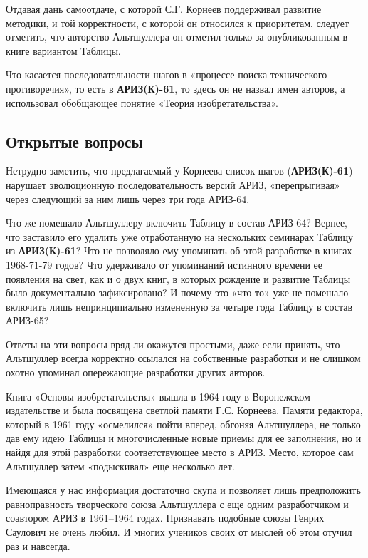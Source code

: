 \documentclass[11pt,a4paper]{article}
\begin{document}
Отдавая дань самоотдаче, с которой С.Г. Корнеев поддерживал развитие методики,
и той корректности, с которой он относился к приоритетам, следует отметить,
что авторство Альтшуллера он отметил только за опубликованным в книге
вариантом Таблицы.

Что касается последовательности шагов в «процессе поиска технического
противоречия», то есть в \textbf{АРИЗ(К)-61}, то здесь он не назвал имен
авторов, а использовал обобщающее понятие «Теория изобретательства».

\subsection*{Открытые вопросы}

Нетрудно заметить, что предлагаемый у Корнеева список шагов
(\textbf{АРИЗ(К)-61}) нарушает эволюционную последовательность версий АРИЗ,
«перепрыгивая» через следующий за ним лишь через три года АРИЗ-64.

Что же помешало Альтшуллеру включить Таблицу в состав АРИЗ-64? Вернее, что
заставило его удалить уже отработанную на нескольких семинарах Таблицу из
\textbf{АРИЗ(К)-61}? Что не позволяло ему упоминать об этой разработке в
книгах 1968-71-79 годов? Что удерживало от упоминаний истинного времени ее
появления на свет, как и о двух книг, в которых рождение и развитие Таблицы
было документально зафиксировано? И почему это «что-то» уже не помешало
включить лишь непринципиально измененную за четыре года Таблицу в состав
АРИЗ-65?

Ответы на эти вопросы вряд ли окажутся простыми, даже если принять, что
Альтшуллер всегда корректно ссылался на собственные разработки и не слишком
охотно упоминал опережающие разработки других авторов.

Книга «Основы изобретательства» \cite{Altshuller1964} вышла в 1964 году в
Воронежском издательстве и была посвящена светлой памяти Г.С. Корнеева. Памяти
редактора, который в 1961 году «осмелился» пойти вперед, обгоняя Альтшуллера,
не только дав ему идею Таблицы и многочисленные новые приемы для ее
заполнения, но и найдя для этой разработки соответствующее место в АРИЗ.
Место, которое сам Альтшуллер затем «подыскивал» еще несколько лет.

Имеющаяся у нас информация достаточно скупа и позволяет лишь предположить
равноправность творческого союза Альтшуллера с еще одним разработчиком и
соавтором АРИЗ в 1961--1964 годах. Признавать подобные союзы Генрих Саулович
не очень любил. И многих учеников своих от мыслей об этом отучил раз и
навсегда.
\end{document}
